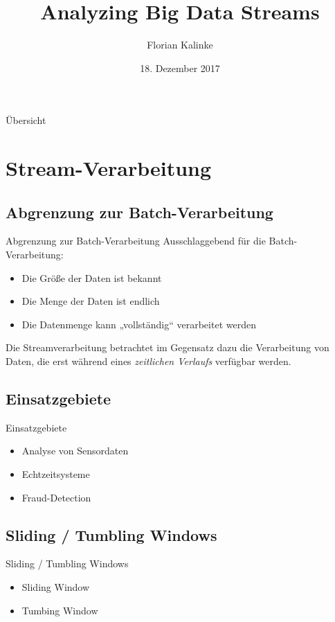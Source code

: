 \documentclass{beamer}
\title{Analyzing Big Data Streams}
\author{Florian Kalinke}
\date{18. Dezember 2017}
\begin{document}
\maketitle

\begin{frame}[t]{Übersicht}
  \tableofcontents
\end{frame}


\section{Stream-Verarbeitung}

\subsection{Abgrenzung zur Batch-Verarbeitung}

\begin{frame}[t]{Abgrenzung zur Batch-Verarbeitung}
  Ausschlaggebend für die Batch-Verarbeitung:
  \begin{itemize}
    \item Die Größe der Daten ist bekannt
    \item Die Menge der Daten ist endlich
    \item Die Datenmenge kann „vollständig“ verarbeitet werden
  \end{itemize}
  Die Streamverarbeitung betrachtet im Gegensatz dazu die Verarbeitung
  von Daten, die erst während eines \textit{zeitlichen Verlaufs} verfügbar
  werden.

\end{frame}

\subsection{Einsatzgebiete}
\begin{frame}[t]{Einsatzgebiete}
\begin{itemize}
  \item Analyse von Sensordaten
  \item Echtzeitsysteme
  \item Fraud-Detection
\end{itemize}
\end{frame}

\subsection{Sliding / Tumbling Windows}
\begin{frame}[t]{Sliding / Tumbling Windows}
\begin{itemize}
  \item Sliding Window
  \item Tumbing Window
\end{itemize}
\end{frame}
\end{document}
